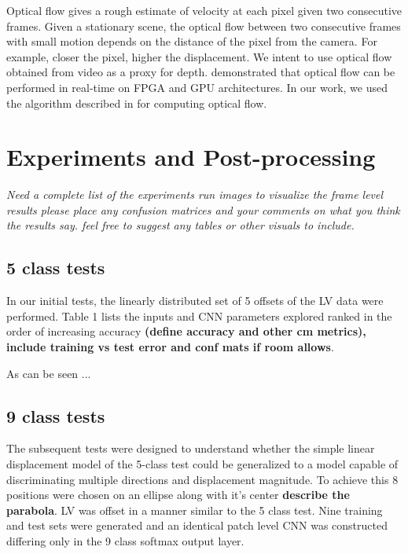 \documentclass{article}
\begin{document}
Optical flow gives a rough estimate of velocity at each pixel given two consecutive frames. Given a stationary scene, the optical flow between two consecutive frames with small motion depends on the distance of the pixel from the camera. For example, closer the pixel, higher the displacement. We intent to use optical flow obtained from video as a proxy for depth. \cite{Opticalflow_realtime} demonstrated that optical flow can be performed in real-time on FPGA and GPU architectures. In our work, we used the algorithm described in \cite{LiuOpticalFlow} for computing optical flow.

\section{Experiments and Post-processing} %
\label{sec:experiments_and_post_processing}
\textit{Need a complete list of the experiments run
images to visualize the frame level results
please place any confusion matrices and your comments on what you think the results say.
feel free to suggest any tables or other visuals to include.}

\subsection{5 class tests}
In our initial tests, the linearly distributed set of 5 offsets of the LV data were performed. Table 1 lists the inputs and CNN parameters explored ranked in the order of increasing accuracy \textbf{(define accuracy and other cm metrics), include training vs test error and conf mats if room allows}.  

As can be seen ... 

\subsection{9 class tests}
The subsequent tests were designed to understand whether the simple linear displacement model of the 5-class test could be generalized to a model capable of discriminating multiple directions and displacement magnitude. To achieve this 8 positions were chosen on an ellipse along with it's center \textbf{describe the parabola}. LV was offset in a manner similar to the 5 class test. Nine training and test sets were generated and an identical patch level CNN was constructed differing only in the 9 class softmax output layer. 
\end{document}
